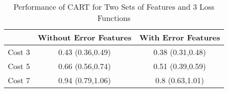 \begin{table}[H]
\begin{center}
\begin{tabular}{c|cc}
  & Without Error Features & With Error Features \\ 
  \hline
Cost 3 & 0.43 (0.36,0.49) & 0.38 (0.31,0.48) \\ 
  Cost 5 & 0.66 (0.56,0.74) & 0.51 (0.39,0.59) \\ 
  Cost 7 & 0.94 (0.79,1.06) & 0.8 (0.63,1.01) \\ 
  \end{tabular}
\caption{Performance of CART for Two Sets of Features and 3 Loss Functions}
\label{tab:results}
\end{center}
\end{table}
